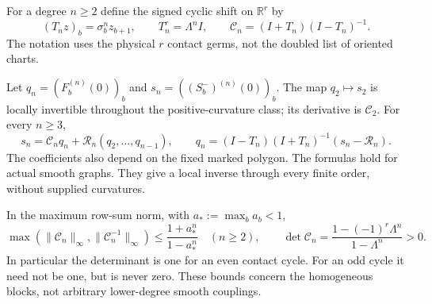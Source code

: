 For a degree $n\ge2$ define the signed cyclic shift on $\mathbb R^r$ by
\begin{equation}\label{eq:v65-shift}
 (T_n z)_b=\sigma_b^n z_{b+1},\qquad
 T_n^r=\Lambda^n I,
 \qquad \mathcal C_n=(I+T_n)(I-T_n)^{-1}.
\end{equation}
The notation uses the physical $r$ contact germs, not the doubled list
of oriented charts.

\begin{theorem}\label{thm:v65-cyclic-jets}
Let $q_n=(F_b^{(n)}(0))_b$ and
$s_n=((S_b^-)^{(n)}(0))_b$.  The map $q_2\mapsto s_2$ is locally
invertible throughout the positive-curvature class; its derivative is
$\mathcal C_2$.  For every $n\ge3$,
\begin{equation}\label{eq:v65-jet-recursion}
 s_n=\mathcal C_n q_n+\mathcal R_n(q_2,\ldots,q_{n-1}),\qquad
 q_n=(I-T_n)(I+T_n)^{-1}(s_n-\mathcal R_n).
\end{equation}
The coefficients also depend on the fixed marked polygon.  The formulas
hold for actual smooth graphs.  They give a local inverse through every
finite order, without supplied curvatures.

In the maximum row-sum norm, with $a_*:=\max_b a_b<1$,
\begin{equation}\label{eq:v65-block-bounds}
 \max(\|\mathcal C_n\|_\infty,\|\mathcal C_n^{-1}\|_\infty)
          \le\frac{1+a_*^n}{1-a_*^n}\quad(n\ge2),\qquad
 \det\mathcal C_n=
       \frac{1-(-1)^r\Lambda^n}{1-\Lambda^n}>0.
\end{equation}
In particular the determinant is one for an even contact cycle.  For an
odd cycle it need not be one, but is never zero.  These bounds concern
the homogeneous blocks, not arbitrary lower-degree smooth couplings.
\end{theorem}
